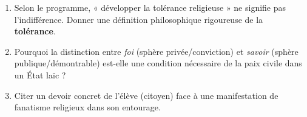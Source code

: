 \documentclass[11pt]{article}
\begin{document}
\begin{exercice}
\begin{enumerate}
    \item Selon le programme, « développer la tolérance religieuse » ne signifie pas l'indifférence. Donner une définition philosophique rigoureuse de la \textbf{tolérance}.
    \item Pourquoi la distinction entre \textit{foi} (sphère privée/conviction) et \textit{savoir} (sphère publique/démontrable) est-elle une condition nécessaire de la paix civile dans un État laïc ?
    \item Citer un devoir concret de l'élève (citoyen) face à une manifestation de fanatisme religieux dans son entourage.
\end{enumerate}
\end{exercice}
\end{document}
